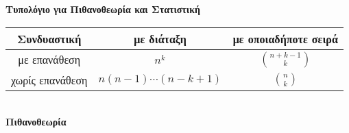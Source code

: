 \documentclass[12pt]{article}
\begin{document}
\renewcommand{\arraystretch}{1.5}

\newcommand{\hl}{\hline}

\newcommand{\pf}[6]{ %
\begin{cases}
\sum_{#1}^{#2} #3 \\[0.5em]
\int_{#4}^{#5}#6 
\end{cases}
}

\newcommand{\tf}[0]{ %
\left\{
    \begin{array}{l}
    \text{διακριτού τύπου} \\
    \text{συνεχούς τύπου}
    \end{array}
    \right.
}

\newcommand{\lol}[1]{ %
\begin{array}{l}
    \vspace{-10pt}\text{} \\
    \vspace{-10pt} \text{#1} \\
    \text{}
    \end{array}
    \tf
}

\newcommand{\ts}[0]{
\ \ 
}



\textbf{Τυπολόγιο για Πιθανοθεωρία και Στατιστική}



\begin{tabular}{|c|c|c|}
     \hl
     \textbf{Συνδυαστική}& με διάταξη & με οποιαδήποτε σειρά \\
     \hl
     με επανάθεση & $n^k$ & $\binom{n+k-1}{k}$ \\
     \hl
     χωρίς επανάθεση & $n(n-1)\cdots(n-k+1)$ & $\binom{n}{k}$ \\
     \hl
\end{tabular}\\



\textbf{Πιθανοθεωρία}
\end{document}
